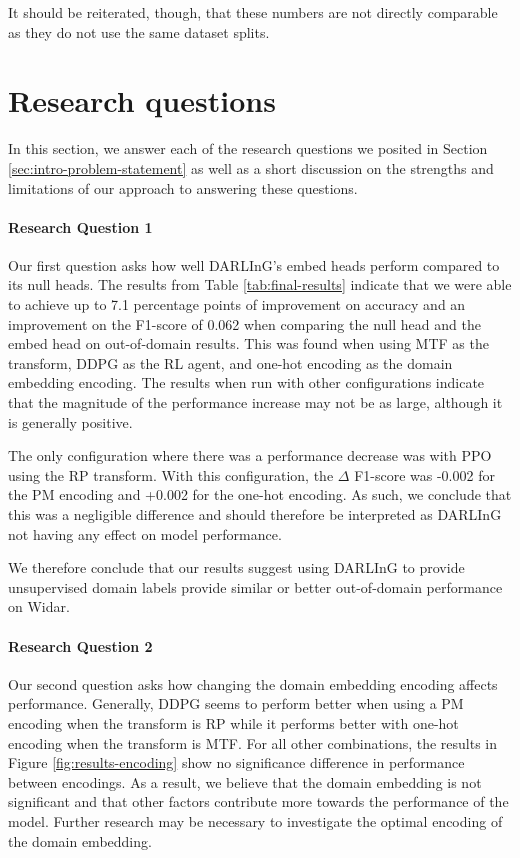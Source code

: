 It should be reiterated, though, that these numbers are not directly comparable as they do not use the same dataset splits.

\section{Research questions}

In this section, we answer each of the research questions we posited in Section \ref{sec:intro-problem-statement} as well as a short discussion on the strengths and limitations of our approach to answering these questions.

\paragraph{Research Question 1}
Our first question asks how well DARLInG's embed heads perform compared to its null heads.
The results from Table \ref{tab:final-results} indicate that we were able to achieve up to 7.1 percentage points of improvement on accuracy and an improvement on the F1-score of 0.062 when comparing the null head and the embed head on out-of-domain results.
This was found when using MTF as the transform, DDPG as the RL agent, and one-hot encoding as the domain embedding encoding.
The results when run with other configurations indicate that the magnitude of the performance increase may not be as large, although it is generally positive.

The only configuration where there was a performance decrease was with PPO using the RP transform.
With this configuration, the $\Delta$ F1-score was -0.002 for the PM encoding and +0.002 for the one-hot encoding.
As such, we conclude that this was a negligible difference and should therefore be interpreted as DARLInG not having any effect on model performance.

We therefore conclude that our results suggest using DARLInG to provide unsupervised domain labels provide similar or better out-of-domain performance on Widar.

\paragraph{Research Question 2}
Our second question asks how changing the domain embedding encoding affects performance.
Generally, DDPG seems to perform better when using a PM encoding when the transform is RP while it performs better with one-hot encoding when the transform is MTF.
For all other combinations, the results in Figure \ref{fig:results-encoding} show no significance difference in performance between encodings.
As a result, we believe that the domain embedding is not significant and that other factors contribute more towards the performance of the model.
Further research may be necessary to investigate the optimal encoding of the domain embedding.

